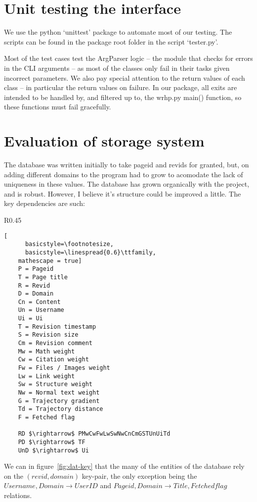 \section{Unit testing the interface}
We use the python `unittest' package to automate most of our
testing. The scripts can be found in the package root folder in the
script `tester.py'.

Most of the test cases test the ArgParser logic -- the module that
checks for errors in the CLI arguments -- as most of the
classes only fail in their tasks given incorrect parameters. We also
pay special attention to the return values of each class -- in
particular the return values on failure. In our package, all exits are
intended to be handled by, and filtered up to, the wrhp.py main()
function, so these functions must fail gracefully.

\section{Evaluation of storage system}
The database was written initially to take pageid and revids for
granted, but, on adding different domains to the program had to grow
to acomodate the lack of uniqueness in these values. The database has
grown organically with the project, and is robust. However, I believe
it's structure could be improved a little. The key dependencies are
such:

\begin{wrapfigure}{R}{0.45\linewidth}
  \begin{lstlisting}[
      basicstyle=\footnotesize,
      basicstyle=\linespread{0.6}\ttfamily,
    mathescape = true]
    P = Pageid
    T = Page title
    R = Revid
    D = Domain
    Cn = Content
    Un = Username
    Ui = Ui
    T = Revision timestamp
    S = Revision size
    Cm = Revision comment
    Mw = Math weight
    Cw = Citation weight
    Fw = Files / Images weight
    Lw = Link weight
    Sw = Structure weight
    Nw = Normal text weight
    G = Trajectory gradient
    Td = Trajectory distance
    F = Fetched flag

    RD $\rightarrow$ PMwCwFwLwSwNwCnCmGSTUnUiTd
    PD $\rightarrow$ TF
    UnD $\rightarrow$ Ui
  \end{lstlisting}
  \caption{Database entities and key dependencies}
  \label{fig:dat-key}
\end{wrapfigure}

We can in figure~\ref{fig:dat-key} that the many of the entities of
the database rely on the $(revid, domain)$ key-pair, the only
exception being the $Username, Domain \rightarrow UserID$ and $Pageid,
Domain \rightarrow Title, Fetched flag$ relations. 

